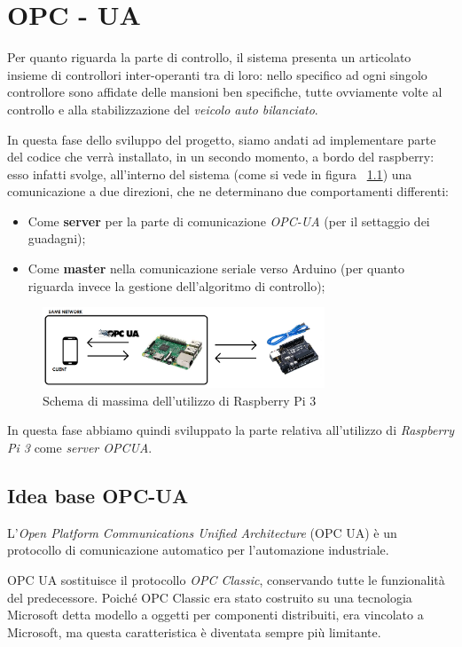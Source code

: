 \chapter{OPC - UA}
Per quanto riguarda la parte di controllo, il sistema presenta un articolato insieme di controllori inter-operanti tra di loro: nello specifico ad ogni singolo controllore sono affidate delle mansioni ben specifiche, tutte ovviamente volte al controllo e alla stabilizzazione del \textit{veicolo auto bilanciato}.

In questa fase dello sviluppo del progetto, siamo andati ad implementare parte del codice che verrà installato, in un secondo momento, a bordo del raspberry: esso infatti svolge, all'interno del sistema (come si vede in figura ~\ref{fig:OPCUA_schema}) una comunicazione a due direzioni, che ne determinano due comportamenti differenti:
\begin{itemize}
	\item Come \textbf{server} per la parte di comunicazione \textit{OPC-UA} (per il settaggio dei guadagni);
	\item Come \textbf{master} nella comunicazione seriale verso Arduino (per quanto riguarda invece la gestione dell'algoritmo di controllo);
\end{itemize}

 \begin{figure}[h]
	\centering   	
	\includegraphics[width=0.75\textwidth]{Immagini/OPCUA_schema.png}
	\caption{Schema di massima dell'utilizzo di Raspberry Pi 3}
	\label{fig:OPCUA_schema}
\end{figure}

In questa fase abbiamo quindi sviluppato la parte relativa all'utilizzo di \textit{Raspberry Pi 3} come \textit{server OPCUA}.

\section{Idea base OPC-UA}
L'\textit{Open Platform Communications Unified Architecture} (OPC UA) è un protocollo di comunicazione automatico per l'automazione industriale. 

OPC UA sostituisce il protocollo \textit{OPC Classic}, conservando tutte le funzionalità del predecessore. Poiché OPC Classic era stato costruito su una tecnologia Microsoft detta modello a oggetti per componenti distribuiti, era vincolato a Microsoft, ma questa caratteristica è diventata sempre più limitante.

